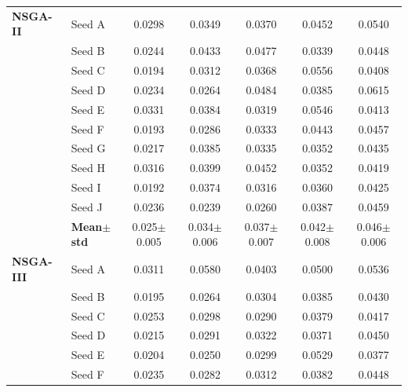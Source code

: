 \begin{table}[H]
{\begin{tabular}{@{}llccccc@{}}
\midrule
 \textbf{NSGA-II} & Seed A & {\small 0.0298} & {\small 0.0349} & {\small 0.0370} & {\small 0.0452} & {\small 0.0540} \\
  & Seed B & {\small 0.0244} & {\small 0.0433} & {\small 0.0477} & {\small 0.0339} & {\small 0.0448} \\
  & Seed C & {\small 0.0194} & {\small 0.0312} & {\small 0.0368} & {\small 0.0556} & {\small 0.0408} \\
  & Seed D & {\small 0.0234} & {\small 0.0264} & {\small 0.0484} & {\small 0.0385} & {\small 0.0615} \\
  & Seed E & {\small 0.0331} & {\small 0.0384} & {\small 0.0319} & {\small 0.0546} & {\small 0.0413} \\
  & Seed F & {\small 0.0193} & {\small 0.0286} & {\small 0.0333} & {\small 0.0443} & {\small 0.0457} \\
  & Seed G & {\small 0.0217} & {\small 0.0385} & {\small 0.0335} & {\small 0.0352} & {\small 0.0435} \\
  & Seed H & {\small 0.0316} & {\small 0.0399} & {\small 0.0452} & {\small 0.0352} & {\small 0.0419} \\
  & Seed I & {\small 0.0192} & {\small 0.0374} & {\small 0.0316} & {\small 0.0360} & {\small 0.0425} \\
  & Seed J & {\small 0.0236} & {\small 0.0239} & {\small 0.0260} & {\small 0.0387} & {\small 0.0459} \\
 & \textbf{Mean$\pm$std} & \cellcolor{ForestGreen!25}0.025$\pm$0.005 & \cellcolor{ForestGreen!25}0.034$\pm$0.006 & \cellcolor{ForestGreen!25}0.037$\pm$0.007 & \cellcolor{ForestGreen!25}0.042$\pm$0.008 & \cellcolor{ForestGreen!25}0.046$\pm$0.006 \\
\midrule
 \textbf{NSGA-III} & Seed A & {\small 0.0311} & {\small 0.0580} & {\small 0.0403} & {\small 0.0500} & {\small 0.0536} \\
  & Seed B & {\small 0.0195} & {\small 0.0264} & {\small 0.0304} & {\small 0.0385} & {\small 0.0430} \\
  & Seed C & {\small 0.0253} & {\small 0.0298} & {\small 0.0290} & {\small 0.0379} & {\small 0.0417} \\
  & Seed D & {\small 0.0215} & {\small 0.0291} & {\small 0.0322} & {\small 0.0371} & {\small 0.0450} \\
  & Seed E & {\small 0.0204} & {\small 0.0250} & {\small 0.0299} & {\small 0.0529} & {\small 0.0377} \\
  & Seed F & {\small 0.0235} & {\small 0.0282} & {\small 0.0312} & {\small 0.0382} & {\small 0.0448} \\

\end{tabular}}
\end{table}
